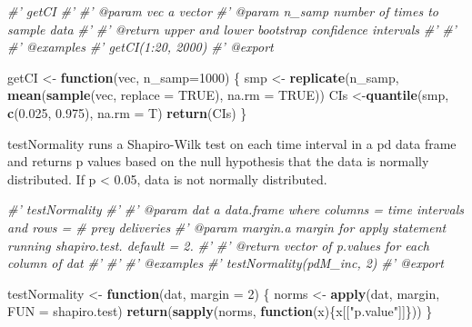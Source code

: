 \documentclass[]{article}
\newenvironment{Shaded}{\begin{snugshade}}{\end{snugshade}}
\newcommand{\CommentTok}[1]{\textcolor[rgb]{0.56,0.35,0.01}{\textit{#1}}}
\newcommand{\ControlFlowTok}[1]{\textcolor[rgb]{0.13,0.29,0.53}{\textbf{#1}}}
\newcommand{\DataTypeTok}[1]{\textcolor[rgb]{0.13,0.29,0.53}{#1}}
\newcommand{\DecValTok}[1]{\textcolor[rgb]{0.00,0.00,0.81}{#1}}
\newcommand{\FloatTok}[1]{\textcolor[rgb]{0.00,0.00,0.81}{#1}}
\newcommand{\KeywordTok}[1]{\textcolor[rgb]{0.13,0.29,0.53}{\textbf{#1}}}
\newcommand{\NormalTok}[1]{#1}
\newcommand{\OtherTok}[1]{\textcolor[rgb]{0.56,0.35,0.01}{#1}}
\newcommand{\StringTok}[1]{\textcolor[rgb]{0.31,0.60,0.02}{#1}}
\begin{document}
\begin{Shaded}
\begin{Highlighting}[]
\CommentTok{#' getCI}
\CommentTok{#' }
\CommentTok{#' @param vec a vector}
\CommentTok{#' @param n_samp number of times to sample data}
\CommentTok{#'}
\CommentTok{#' @return upper and lower bootstrap confidence intervals}
\CommentTok{#' }
\CommentTok{#'}
\CommentTok{#' @examples}
\CommentTok{#'    getCI(1:20, 2000)}
\CommentTok{#' @export}

\NormalTok{getCI <-}\StringTok{ }\ControlFlowTok{function}\NormalTok{(vec, }\DataTypeTok{n_samp=}\DecValTok{1000}\NormalTok{) \{}
\NormalTok{  smp <-}\StringTok{ }\KeywordTok{replicate}\NormalTok{(n_samp, }\KeywordTok{mean}\NormalTok{(}\KeywordTok{sample}\NormalTok{(vec, }\DataTypeTok{replace =} \OtherTok{TRUE}\NormalTok{), }\DataTypeTok{na.rm =} \OtherTok{TRUE}\NormalTok{))}
\NormalTok{  CIs <-}\KeywordTok{quantile}\NormalTok{(smp, }\KeywordTok{c}\NormalTok{(}\FloatTok{0.025}\NormalTok{, }\FloatTok{0.975}\NormalTok{), }\DataTypeTok{na.rm =}\NormalTok{ T)}
  \KeywordTok{return}\NormalTok{(CIs)}
\NormalTok{\}}
\end{Highlighting}
\end{Shaded}

testNormality runs a Shapiro-Wilk test on each time interval in a pd
data frame and returns p values based on the null hypothesis that the
data is normally distributed. If p \textless{} 0.05, data is not
normally distributed.

\begin{Shaded}
\begin{Highlighting}[]
\CommentTok{#' testNormality}
\CommentTok{#' }
\CommentTok{#' @param dat a data.frame where columns = time intervals and rows = # prey deliveries}
\CommentTok{#' @param margin.a margin for apply statement running shapiro.test. default = 2.}
\CommentTok{#'}
\CommentTok{#' @return vector of p.values for each column of dat}
\CommentTok{#' }
\CommentTok{#'}
\CommentTok{#' @examples}
\CommentTok{#'    testNormality(pdM_inc, 2)}
\CommentTok{#' @export}

\NormalTok{testNormality <-}\StringTok{ }\ControlFlowTok{function}\NormalTok{(dat, }\DataTypeTok{margin =} \DecValTok{2}\NormalTok{) \{}
\NormalTok{  norms <-}\StringTok{ }\KeywordTok{apply}\NormalTok{(dat, margin, }\DataTypeTok{FUN =}\NormalTok{ shapiro.test)}
  \KeywordTok{return}\NormalTok{(}\KeywordTok{sapply}\NormalTok{(norms, }\ControlFlowTok{function}\NormalTok{(x)\{x[[}\StringTok{"p.value"}\NormalTok{]]\}))}
\NormalTok{\}}
\end{Highlighting}
\end{Shaded}
\end{document}
